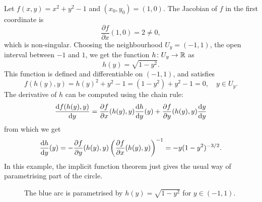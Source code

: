 \begin{example}
 Let $f(x,y)=x^2+y^2-1$ and $(x_0,y_0)=(1,0)$. The Jacobian of $f$ in the first coordinate is
 \begin{equation*}
  \frac{\partial f}{\partial x}(1,0) = 2 \neq 0, 
 \end{equation*}
which is non-singular. Choosing the neighbourhood $U_y=(-1,1)$, the open interval between $-1$ and $1$, we get the function $h\colon U_y\to \mathbb{R}$ as
\begin{equation*}
 h(y) = \sqrt{1-y^2}.
\end{equation*}
This function is defined and differentiable on $(-1,1)$, and satisfies
\begin{equation*}
 f(h(y),y) = h(y)^2+y^2-1 = (1-y^2)+y^2-1 = 0, \quad y\in U_y.
\end{equation*}
The derivative of $h$ can be computed using the chain rule:
\begin{equation*}
 \frac{\mathrm{d}{f}(h(y),y)}{\mathrm{d}{y}} = \frac{\partial f}{\partial x}(h(y),y)\frac{\mathrm{d}{h}}{\mathrm{d}{y}}(y)+\frac{\partial f}{\partial y}(h(y),y)\frac{\mathrm{d}{y}}{\mathrm{d}{y}} 
\end{equation*}
from which we get
\begin{equation*}
 \frac{\mathrm{d}{h}}{\mathrm{d}{y}}(y) = -\frac{\partial f}{\partial y}(h(y),y)\left(\frac{\partial f}{\partial x}(h(y),y)\right)^{-1} = -y(1-y^2)^{-3/2}.
\end{equation*}
In this example, the implicit function theorem just gives the usual way of parametrising part of the circle.

\begin{figure}[ht!]
\centering
{}
\caption{The blue arc is parametrised by $h(y)=\sqrt{1-y^2}$ for $y\in (-1,1)$.}
\end{figure}

\end{example}

